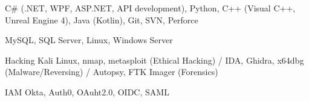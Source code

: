 	{}
	{}

\begin{cvskills}
	
	\cvskill
	{} %
	{C\# (.NET, WPF,  ASP.NET,  API development), Python, C++ (Visual C++, Unreal Engine 4), Java (Kotlin), Git, SVN, Perforce} %
	
	\cvskill
	{} %
	{MySQL, SQL Server, Linux, Windows Server} %
	
	\cvskill
	{Hacking} %
	{Kali Linux, nmap, metasploit (Ethical Hacking) / IDA, Ghidra, x64dbg (Malware/Reversing) / Autopsy, FTK Imager (Forensics)} %
	
	\cvskill
	{IAM} %
	{Okta, Auth0, OAuht2.0, OIDC, SAML} %
	
\end{cvskills}